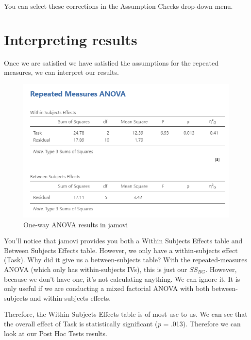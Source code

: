 \documentclass[
]{book}
\begin{document}
You can select these corrections in the Assumption Checks drop-down menu.

\hypertarget{interpreting-results-5}{%
\section{Interpreting results}\label{interpreting-results-5}}

Once we are satisfied we have satisfied the assumptions for the repeated measures, we can interpret our results.

\begin{figure}

{\centering \includegraphics[width=1\linewidth]{images/05-repeated-measures-anova/rm-anova_results} 

}

\caption{One-way ANOVA results in jamovi}\label{fig:unnamed-chunk-7}
\end{figure}

You'll notice that jamovi provides you both a Within Subjects Effects table and Between Subjects Effects table. However, we only have a within-subjects effect (Task). Why did it give us a between-subjects table? With the repeated-measures ANOVA (which only has within-subjects IVs), this is just our \(SS_{BG}\). However, because we don't have one, it's not calculating anything. We can ignore it. It is only useful if we are conducting a mixed factorial ANOVA with both between-subjects and within-subjects effects.

Therefore, the Within Subjects Effects table is of most use to us. We can see that the overall effect of Task is statistically significant (\emph{p} = .013). Therefore we can look at our Post Hoc Tests results.
\end{document}
